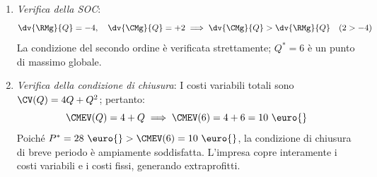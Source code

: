 \begin{esercizio}
\begin{enumerate}
    \item \textit{Verifica della SOC}:
    \begin{equation*}
        \dv{\RMg}{Q} = -4, \quad \dv{\CMg}{Q} = +2 \implies \dv{\CMg}{Q} > \dv{\RMg}{Q} \quad (2 > -4)
    \end{equation*}
    La condizione del secondo ordine è verificata strettamente; $Q^* = 6$ è un punto di massimo globale.
    
    \item \textit{Verifica della condizione di chiusura}:
    I costi variabili totali sono $\CV(Q) = 4Q + Q^2$; pertanto:
    \begin{equation*}
        \CMEV(Q) = 4 + Q \implies \CMEV(6) = 4 + 6 = 10\text{ \euro{}}
    \end{equation*}
    Poiché $P^* = 28\text{ \euro{}} > \CMEV(6) = 10\text{ \euro{}}$, la condizione di chiusura di breve periodo è ampiamente soddisfatta. L'impresa copre interamente i costi variabili e i costi fissi, generando extraprofitti.
\end{enumerate}
\end{esercizio}
